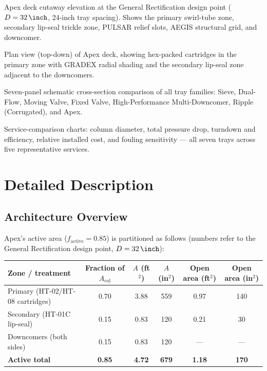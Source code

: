 \documentclass[11pt,letterpaper]{article}
\begin{document}
\begin{description}[nosep]
  \item[Figure~\ref{fig:cross_section}] Apex deck cutaway elevation at the
    General Rectification design point ($D=\SI{32}{\inch}$, 24-inch tray
    spacing).  Shows the primary swirl-tube zone, secondary lip-seal trickle
    zone, PULSAR relief slots, AEGIS structural grid, and downcomer.
  \item[Figure~\ref{fig:plan_view}] Plan view (top-down) of Apex deck,
    showing hex-packed cartridges in the primary zone with GRADEX radial
    shading and the secondary lip-seal zone adjacent to the downcomers.
  \item[Figure~\ref{fig:family_cross_sections}] Seven-panel schematic
    cross-section comparison of all tray families: Sieve, Dual-Flow, Moving
    Valve, Fixed Valve, High-Performance Multi-Downcomer, Ripple (Corrugated),
    and Apex.
  \item[Figures~\ref{fig:diameter}--\ref{fig:cost}] Service-comparison charts:
    column diameter, total pressure drop, turndown and efficiency, relative
    installed cost, and fouling sensitivity --- all seven trays across five
    representative services.
\end{description}

\section{Detailed Description}
\label{sec:detailed}

\subsection{Architecture Overview}
\label{sec:architecture}

Apex's active area ($f_{\mathrm{active}}=0.85$) is partitioned as follows
(numbers refer to the General Rectification design point, $D=\SI{32}{\inch}$):

\begin{center}
\small
\begin{tabular}{lccccc}
\toprule
Zone / treatment & Fraction of $A_{\mathrm{col}}$ & $A$ (ft$^2$)
  & $A$ (in$^2$) & Open area (ft$^2$) & Open area (in$^2$)\\
\midrule
Primary (HT-02/HT-08 cartridges) & 0.70 & 3.88 & 559 & 0.97 & 140\\
Secondary (HT-01C lip-seal)       & 0.15 & 0.83 & 120 & 0.21 &  30\\
Downcomers (both sides)           & 0.15 & 0.83 & 120 & ---  & ---\\
\textbf{Active total}             & \textbf{0.85} & \textbf{4.72} & \textbf{679}
  & \textbf{1.18} & \textbf{170}\\
\bottomrule
\end{tabular}
\end{center}
\end{document}
